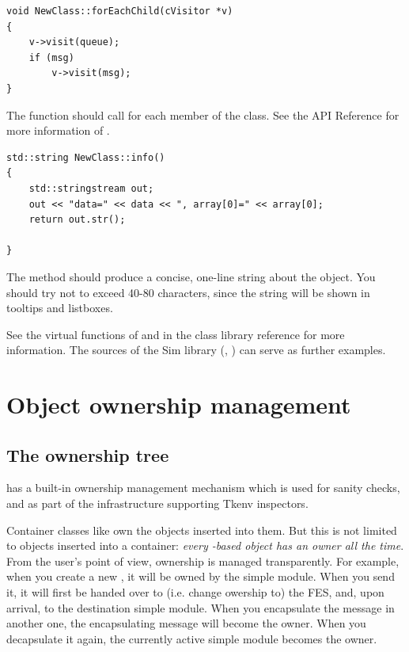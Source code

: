 \begin{verbatim}
void NewClass::forEachChild(cVisitor *v)
{
    v->visit(queue);
    if (msg)
        v->visit(msg);
}
\end{verbatim}

The  function should call 
for each  member of the class. See the API Reference for more
information of .

\begin{verbatim}
std::string NewClass::info()
{
    std::stringstream out;
    out << "data=" << data << ", array[0]=" << array[0];
    return out.str();

}
\end{verbatim}

The  method should produce a concise, one-line string
about the object. You should try not to exceed 40-80 characters, since the
string will be shown in tooltips and listboxes.

See the virtual functions of  and 
in the class library reference for more information. The sources of the
Sim library (, ) can serve as further examples.



\section{Object ownership management}
\label{sec:ch-sim-lib:ownership-management}

\subsection{The ownership tree}

{\opp} has a built-in ownership management mechanism which
is used for sanity checks, and as part of the infrastructure
supporting Tkenv inspectors.

Container classes like  own the objects inserted
into them. But this is not limited to objects inserted into a container:
\textit{every -based object has an owner all the time}.
From the user's point of view, ownership is managed transparently.
For example, when you create a new ,
it will be owned by the simple module. When you send it, it will
first be handed over to (i.e. change owership to) the FES, and,
upon arrival, to the destination simple module. When you encapsulate
the message in another one, the encapsulating message will become
the owner. When you decapsulate it again, the currently active
simple module becomes the owner.

